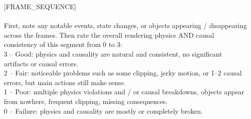 \documentclass{llmxive}
\begin{document}
\begin{tcolorbox}[d5box, title={Causal Fidelity --- Track 1: Rendering Physics \& Causal Consistency (0--3)}]
\begin{tcolorbox}[userprompt]
\mbox{[FRAME\_SEQUENCE]}\\
\\
First, note any notable events, state changes, or objects appearing / disappearing across the frames. Then rate the overall rendering physics AND causal consistency of this segment from 0 to 3:\\
  3 -- Good: physics and causality are natural and consistent, no significant artifacts or causal errors.\\
  2 -- Fair: noticeable problems such as some clipping, jerky motion, or 1--2 causal errors, but main actions still make sense.\\
  1 -- Poor: multiple physics violations and / or causal breakdowns, objects appear from nowhere, frequent clipping, missing consequences.\\
  0 -- Failure: physics and causality are mostly or completely broken.
\end{tcolorbox}
\end{tcolorbox}

\vspace{6pt}
\end{document}

